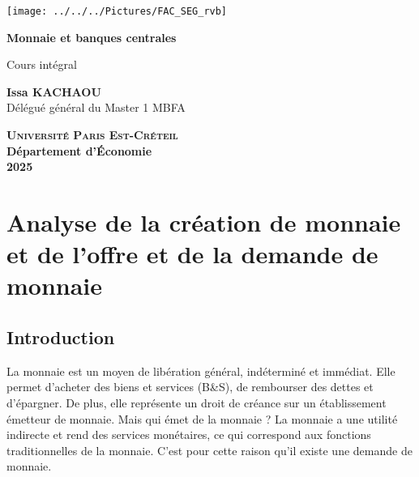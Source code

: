 \documentclass[a4paper, 12pt]{report}
\begin{document}
	
\begin{titlepage}
	\centering
	\begin{center}
		\texttt{[image: ../../../Pictures/FAC\_SEG\_rvb]}
	\end{center}
	\vspace*{2cm}
	
	\Huge
	
	\textbf{Monnaie et banques centrales}
	\vspace{1.5cm}
	
	\Large
	Cours intégral
	
	\vspace{2cm}
	
	\textbf{Issa KACHAOU} \\
	{\normalsize Délégué général du Master 1 MBFA}
	
	
	\vfill
	
	\Large
	
	\textsc{\textbf{Université Paris Est-Créteil}}	 \\
	\textbf{Département d'\'Economie} \\
	\textbf{2025}
	
\end{titlepage}
\thispagestyle{empty}
\newpage
\clearpage
\mbox{}
\thispagestyle{empty}

\tableofcontents

\thispagestyle{empty}
\newpage
\mbox{}
\thispagestyle{empty} %

\pagestyle{plain} 
	
\chapter{Analyse de la création de	monnaie et de l'offre et de la demande de monnaie}
	
\section*{Introduction}


La monnaie est un moyen de libération général, indéterminé et immédiat. Elle permet d'acheter des biens et services (B\&S), de rembourser des dettes et d'épargner. De plus, elle représente un droit de créance sur un établissement émetteur de monnaie. Mais qui émet de la monnaie ? La monnaie a une utilité indirecte et rend des services monétaires, ce qui correspond aux fonctions traditionnelles de la monnaie. C'est pour cette raison qu'il existe une demande de monnaie.
\end{document}
